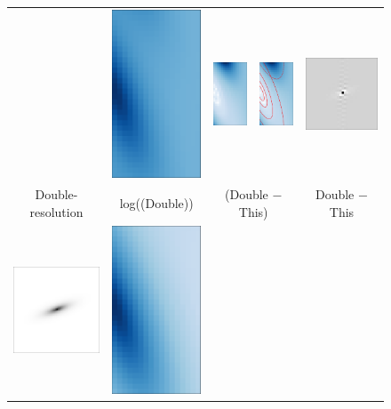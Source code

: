 \documentclass[11pt,preprint]{aastex}
\begin{document}
\begin{figure}
\begin{center}
\begin{tabular}{@{}ccccc@{}}
      &
      \includegraphics[height=0.24\textwidth]{lopass-naive-logfourier}
      &
      \includegraphics[height=0.24\textwidth]{lopass-diff-pixmine-fourier}
      &
      \includegraphics[height=0.24\textwidth]{lopass-diff-pixmine-fourier-ann}
      &
      \includegraphics[height=0.24\textwidth]{lopass-diff-pixmine-pix}
      \\
      Double-resolution
      &
      log(\F(Double))
      &
      \multicolumn{2}{c}{\F(Double $-$ This)}
      &
      Double $-$ This
      \\
      \includegraphics[height=0.24\textwidth]{lopass-dpix-pix}
      &
      \includegraphics[height=0.24\textwidth]{lopass-dclip-logfourier}

\end{tabular}
\end{center}
\end{figure}
\end{document}
